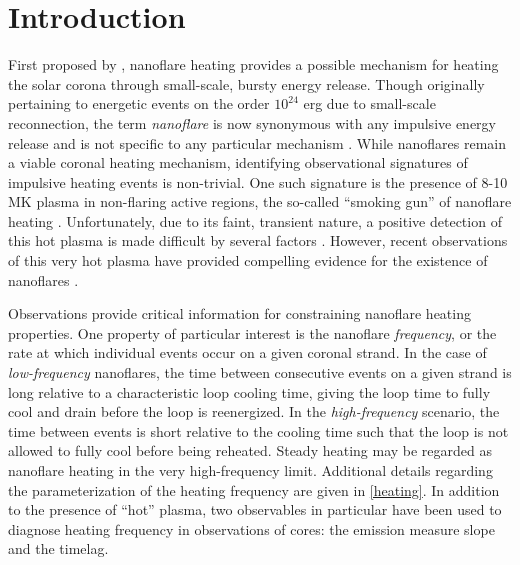 \section{Introduction}\label{introduction}

First proposed by \citet{parker_nanoflares_1988}, nanoflare heating provides a possible mechanism for heating the solar corona through small-scale, bursty energy release. Though originally pertaining to energetic events on the order $10^{24}$ erg due to small-scale reconnection, the term \textit{nanoflare} is now synonymous with any impulsive energy release and is not specific to any particular mechanism \citep{klimchuk_key_2015}. While nanoflares remain a viable coronal heating mechanism, identifying observational signatures of impulsive heating events is non-trivial. One such signature is the presence of 8-10 MK plasma in non-flaring active regions, the so-called ``smoking gun'' of nanoflare heating \citep{cargill_implications_1994}. Unfortunately, due to its faint, transient nature, a positive detection of this hot plasma is made difficult by several factors \citep{winebarger_defining_2012,barnes_inference_2016}. However, recent observations of this very hot plasma have provided compelling evidence for the existence of nanoflares \citep[e.g.][]{reale_evidence_2009,schmelz_hinode_2009,testa_hinode/eis_2012,brosius_pervasive_2014,caspi_new_2015,parenti_spectroscopy_2017,ishikawa_detection_2017}.

Observations provide critical information for constraining nanoflare heating properties. One property of particular interest is the nanoflare \textit{frequency}, or the rate at which individual events occur on a given coronal strand. In the case of \textit{low-frequency} nanoflares, the time between consecutive events on a given strand is long relative to a characteristic loop cooling time, giving the loop time to fully cool and drain before the loop is reenergized. In the \textit{high-frequency} scenario, the time between events is short relative to the cooling time such that the loop is not allowed to fully cool before being reheated. Steady heating may be regarded as nanoflare heating in the very high-frequency limit. Additional details regarding the parameterization of the heating frequency are given in \autoref{heating}. In addition to the presence of ``hot'' plasma, two observables in particular have been used to diagnose heating frequency in observations of \AR{} cores: the emission measure slope and the timelag. 

